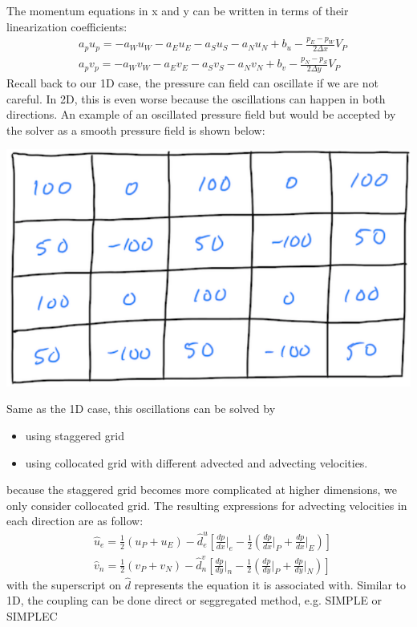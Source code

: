 \documentclass[11pt]{article}
\begin{document}
\begin{enumerate}
The momentum equations in x and y can be written in terms of their linearization coefficients:
\begin{equation*}
\begin{aligned}
&a_p u_p = -a_W u_W - a_E u_E -a_S u_S - a_N u_N + b_u - \frac{p_E-p_W}{2\Delta x}V_P\\
&a_p v_p = -a_W v_W - a_E v_E -a_S v_S - a_N v_N + b_v - \frac{p_N-p_S}{2\Delta y}V_P
\end{aligned}
\end{equation*}
Recall back to our 1D case, the pressure can field can oscillate if we are not careful. In 2D,
this is even worse because the oscillations can happen in both directions. An example of an oscillated
pressure field but would be accepted by the solver as a smooth pressure field is shown below:
\begin{center}
\includegraphics[scale=0.5]{../pic/2D_smooth.png}
\end{center}

Same as the 1D case, this oscillations can be solved by
\begin{itemize}
\item using staggered grid
\item using collocated grid with different advected and advecting velocities.
\end{itemize}
because the staggered grid becomes more complicated at higher dimensions, we only consider
collocated grid. The resulting expressions for advecting velocities in each direction are as follow:
\begin{equation*}
\begin{aligned}
&\hat{u}_e = \frac{1}{2}(u_P + u_E) - \hat{d}_e^u \left[\frac{dp}{dx}\biggr\rvert_e -
\frac{1}{2}\left(\frac{dp}{dx}\biggr\rvert_P + \frac{dp}{dx}\biggr\rvert_E \right)\right]\\
&\hat{v}_n = \frac{1}{2}(v_P + v_N) - \hat{d}_n^v \left[\frac{dp}{dy}\biggr\rvert_n -
\frac{1}{2}\left(\frac{dp}{dy}\biggr\rvert_P + \frac{dp}{dy}\biggr\rvert_N \right)\right]
\end{aligned}
\end{equation*}
with the superscript on \(\hat{d}\) represents the equation it is associated with. Similar to 1D, the
coupling can be done direct or seggregated method, e.g. SIMPLE or SIMPLEC
\end{enumerate}
\end{document}
